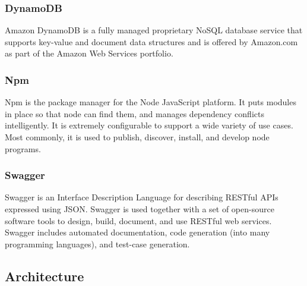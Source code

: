 \subsubsection{DynamoDB}
Amazon DynamoDB is a fully managed proprietary NoSQL database service that supports key-value and document data structures and is offered by Amazon.com as part of the Amazon Web Services portfolio.
\subsubsection{Npm}
Npm is the package manager for the Node JavaScript platform. It puts modules in place so that node can find them, and manages dependency conflicts intelligently.
It is extremely configurable to support a wide variety of use cases. Most commonly, it is used to publish, discover, install, and develop node programs.
\subsubsection{Swagger}
Swagger is an Interface Description Language for describing RESTful APIs expressed using JSON. Swagger is used together with a set of open-source software tools to design, build, document, and use RESTful web services. Swagger includes automated documentation, code generation (into many programming languages), and test-case generation.


\subsection{Architecture}\label{_architecture}

